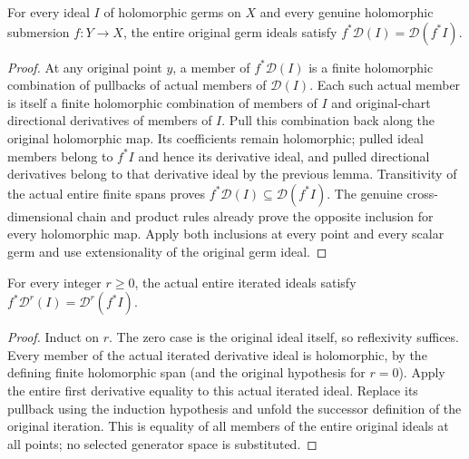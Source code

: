 \begin{theorem}\label{hir:submersion-entire-derivative-ideal-equality}
For every ideal $I$ of holomorphic germs on $X$ and every genuine holomorphic
submersion $f:Y\to X$, the entire original germ ideals satisfy
$f^*\mathcal D(I)=\mathcal D(f^*I)$.
\leanok
{}
\end{theorem}
\begin{proof}
At any original point $y$, a member of $f^*\mathcal D(I)$ is a finite
holomorphic combination of pullbacks of actual members of $\mathcal D(I)$.
Each such actual member is itself a finite holomorphic combination of members
of $I$ and original-chart directional derivatives of members of $I$.
Pull this combination back along the original holomorphic map. Its coefficients
remain holomorphic; pulled ideal members belong to $f^*I$ and hence its
derivative ideal, and pulled directional derivatives belong to that derivative
ideal by the previous lemma. Transitivity of the actual entire finite spans
proves $f^*\mathcal D(I)\subseteq\mathcal D(f^*I)$.
The genuine cross-dimensional chain and product rules already prove the
opposite inclusion for every holomorphic map. Apply both inclusions at every
point and every scalar germ and use extensionality of the original germ ideal.
\end{proof}

\begin{theorem}\label{hir:submersion-entire-iterated-derivative-equality}
For every integer $r\ge0$, the actual entire iterated ideals satisfy
$f^*\mathcal D^r(I)=\mathcal D^r(f^*I)$.
\leanok
{}
\end{theorem}
\begin{proof}
Induct on $r$. The zero case is the original ideal itself, so reflexivity
suffices. Every member of the actual iterated derivative ideal is holomorphic,
by the defining finite holomorphic span (and the original hypothesis for $r=0$).
Apply the entire first derivative equality to this actual iterated ideal.
Replace its pullback using the induction hypothesis and unfold the successor
definition of the original iteration. This is equality of all members of the
entire original ideals at all points; no selected generator space is substituted.
\end{proof}
